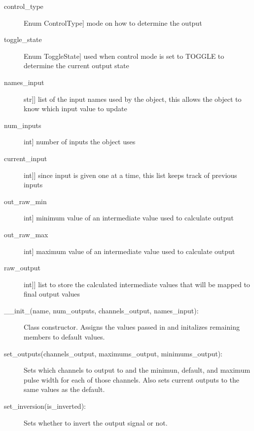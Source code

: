 \documentclass[letterpaper,10pt,english]{sphinxmanual}
\begin{document}
\begin{fulllineitems}
\begin{description}
\item[{control\_type}] \leavevmode{[}Enum ControlType{]}
\sphinxAtStartPar
mode on how to determine the output

\item[{toggle\_state}] \leavevmode{[}Enum ToggleState{]}
\sphinxAtStartPar
used when control mode is set to TOGGLE to determine the current output state

\item[{names\_input}] \leavevmode{[}{[}str{]}{]}
\sphinxAtStartPar
list of the input names used by the object, this allows the object to know which input value to update

\item[{num\_inputs}] \leavevmode{[}int{]}
\sphinxAtStartPar
number of inputs the object uses

\item[{current\_input}] \leavevmode{[}{[}int{]}{]}
\sphinxAtStartPar
since input is given one at a time, this list keeps track of previous inputs

\item[{out\_raw\_min}] \leavevmode{[}int{]}
\sphinxAtStartPar
minimum value of an intermediate value used to calculate output

\item[{out\_raw\_max}] \leavevmode{[}int{]}
\sphinxAtStartPar
maximum value of an intermediate value used to calculate output

\item[{raw\_output}] \leavevmode{[}{[}int{]}{]}
\sphinxAtStartPar
list to store the calculated intermediate values that will be mapped to final output values

\end{description}
\begin{description}
\item[{\_\_init\_(name, num\_outputs, channels\_output, names\_input):}] \leavevmode
\sphinxAtStartPar
Class constructor. Assigns the values passed in and initalizes remaining members to default values.

\item[{set\_outputs(channels\_output, maximums\_output, minimums\_output):}] \leavevmode
\sphinxAtStartPar
Sets which channels to output to and the minimun, default, and maximum pulse width for each of those channels.
Also sets current outputs to the same values as the default.

\item[{set\_inversion(is\_inverted):}] \leavevmode
\sphinxAtStartPar
Sets whether to invert the output signal or not.


\end{description}
\end{fulllineitems}
\end{document}
